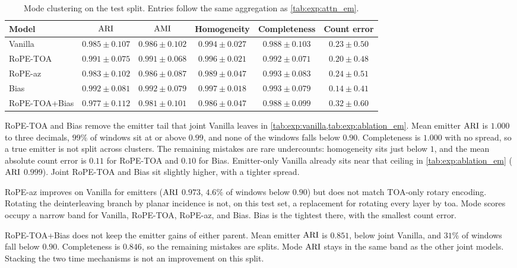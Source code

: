 \begin{table}[H]
  \centering
  \small
  \caption{Mode clustering on the test split. Entries follow the same aggregation as \cref{tab:exp:attn_em}.}
  \label{tab:exp:attn_md}
  \begin{tabular}{@{}lccccc@{}}
    \toprule
    Model & $\mathrm{ARI}$ & $\mathrm{AMI}$ & Homogeneity & Completeness & Count error \\
    \midrule
    Vanilla   & $0.985\pm0.107$ & $0.986\pm0.102$ & $0.994\pm0.027$ & $0.988\pm0.103$ & $0.23\pm0.50$ \\
    RoPE-TOA  & $0.991\pm0.075$ & $0.991\pm0.068$ & $0.996\pm0.021$ & $0.992\pm0.071$ & $0.20\pm0.48$ \\
    RoPE-az   & $0.983\pm0.102$ & $0.986\pm0.087$ & $0.989\pm0.047$ & $\mathbf{0.993\pm0.083}$ & $0.24\pm0.51$ \\
    Bias      & $\mathbf{0.992\pm0.081}$ & $\mathbf{0.992\pm0.079}$ & $\mathbf{0.997\pm0.018}$ & $\mathbf{0.993\pm0.079}$ & $\mathbf{0.14\pm0.41}$ \\
    RoPE-TOA+Bias & $0.977\pm0.112$ & $0.981\pm0.101$ & $0.986\pm0.047$ & $0.988\pm0.099$ & $0.32\pm0.60$ \\
    \bottomrule
  \end{tabular}
\end{table}

RoPE-TOA and Bias remove the emitter tail that joint Vanilla leaves in \cref{tab:exp:vanilla,tab:exp:ablation_em}.
Mean emitter $\mathrm{ARI}$ is $1.000$ to three decimals, $99\%$ of windows sit at or above $0.99$, and none of the windows falls below $0.90$.
Completeness is $1.000$ with no spread, so a true emitter is not split across clusters.
The remaining mistakes are rare undercounts: homogeneity sits just below $1$, and the mean absolute count error is $0.11$ for RoPE-TOA and $0.10$ for Bias.
Emitter-only Vanilla already sits near that ceiling in \cref{tab:exp:ablation_em} ($\mathrm{ARI}$ $0.999$).
Joint RoPE-TOA and Bias sit slightly higher, with a tighter spread.

RoPE-az improves on Vanilla for emitters ($\mathrm{ARI}$ $0.973$, $4.6\%$ of windows below $0.90$) but does not match TOA-only rotary encoding.
Rotating the deinterleaving branch by planar incidence is not, on this test set, a replacement for rotating every layer by \gls{toa}.
Mode scores occupy a narrow band for Vanilla, RoPE-TOA, RoPE-az, and Bias.
Bias is the tightest there, with the smallest count error.

RoPE-TOA+Bias does not keep the emitter gains of either parent.
Mean emitter $\mathrm{ARI}$ is $0.851$, below joint Vanilla, and $31\%$ of windows fall below $0.90$.
Completeness is $0.846$, so the remaining mistakes are splits.
Mode $\mathrm{ARI}$ stays in the same band as the other joint models.
Stacking the two time mechanisms is not an improvement on this split.

